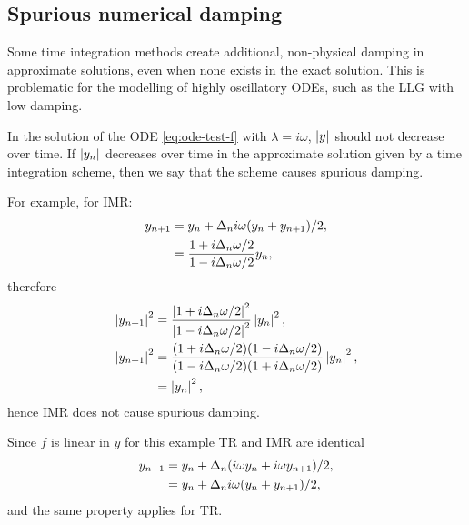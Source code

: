 \subsection{Spurious numerical damping}
\label{sec:numerical-damping}

Some time integration methods create additional, non-physical damping in approximate solutions, even when none exists in the exact solution.
This is problematic for the modelling of highly oscillatory ODEs, such as the LLG with low damping.

In the solution of the ODE \cref{eq:ode-test-f} with $\lambda = i\omega$, $\left|{y} \right|$ should not decrease over time.
If $\left|{y_n} \right|$ decreases over time in the approximate solution given by a time integration scheme, then we say that the scheme causes spurious damping.

For example, for IMR:
\begin{equation}
  \begin{aligned}
    y_{n+1} &= y_n + \Delta_{n} i \omega (y_n + y_{n+1})/2, \\
    &= \frac{1 + i\Delta_{n} \omega/2}{1 - i\Delta_{n} \omega/2} y_n,
  \end{aligned}
\end{equation}
therefore
\begin{equation}
  \begin{aligned}
    \left|{y_{n+1}} \right|^2 &=  \frac{\left|{1 + i\Delta_{n} \omega/2} \right|^2}{\left|{1 - i\Delta_{n} \omega/2} \right|^2} \left|{y_n} \right|^2, \\
    \left|{y_{n+1}} \right|^2 &=  \frac{(1 + i\Delta_{n} \omega/2)(1 - i\Delta_{n} \omega/2)}
    {(1 - i\Delta_{n} \omega/2)(1 + i\Delta_{n} \omega/2)} \left|{y_n} \right|^2, \\
    &=  \left|{y_n} \right|^2,
  \end{aligned}
\end{equation}
hence IMR does not cause spurious damping.

Since $f$ is linear in $y$ for this example TR and IMR are identical
\begin{equation}
  \begin{aligned}
    y_{n+1} &= y_n + \Delta_{n}(i\omega y_n + i\omega y_{n+1})/2, \\
    &= y_n + \Delta_{n} i \omega (y_n + y_{n+1})/2,
  \end{aligned} 
\end{equation}
and the same property applies for TR.

